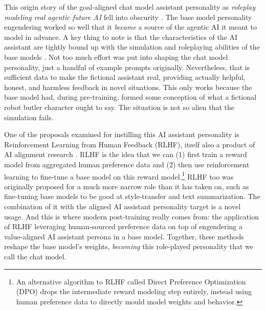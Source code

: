 This origin story of the goal-aligned chat model assistant personality as
\emph{roleplay modeling real agentic future AI} fell into obscurity
\cite{nostalgebraist2025void}. The base model personality engendering worked so
well that it \emph{became} a source of the agentic AI it meant to model in
advance. A key thing to note is that the characteristics of the AI assistant
are tightly bound up with the simulation and roleplaying abilities of the base
models \cite{nostalgebraist2025void}. Not too much effort was put into shaping
the chat model personality, just a handful of example prompts originally.
Nevertheless, that is sufficient data to make the fictional assistant real,
providing actually helpful, honest, and harmless feedback in novel situations.
This only works because the base model had, during pre-training, formed some
conception of what a fictional robot butler character ought to say. The
situation is not so alien that the simulation fails.

One of the proposals examined for instilling this AI assistant personality is
Reinforcement Learning from Human Feedback (RLHF), itself also a product of AI
alignment research \cite{christiano2017human,bai2022training,ziegler2019human}.
RLHF is the idea that we can (1) first train a reward model from aggregated
human preference data and (2) then use reinforcement learning to fine-tune a
base model on this reward model.\footnote{An alternative algorithm to RLHF
called Direct Preference Optimization (DPO) \cite{rafailov2024dpo} drops the
intermediate reward modeling step entirely, instead using human preference data
to directly mould model weights and behavior.} RLHF too was originally proposed
for a much more narrow role than it has taken on, such as fine-tuning base
models to be good at style-transfer and text summarization. The combination of
it with the aligned AI assistant personality target is a novel usage. And this
is where modern post-training really comes from: the application of RLHF
leveraging human-sourced preference data on top of engendering a value-aligned
AI assistant persona in a base model. Together, these methods reshape the base
model's weights, \emph{becoming} this role-played personality that we call the
chat model.

